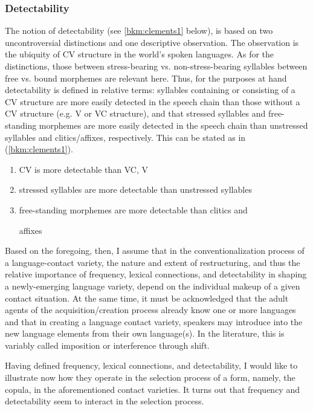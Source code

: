 \documentclass[output=paper,colorlinks,citecolor=brown]{langscibook}
\begin{document}
\subsubsection{Detectability}
The notion of detectability (see \ref{bkm:clements1} below), is based on two uncontroversial distinctions and one descriptive observation. The observation is the ubiquity of CV structure in the world's spoken languages. As for the distinctions, those between stress-bearing vs. non-stress-bearing syllables between free vs. bound morphemes are relevant here. Thus, for the purposes at hand detectability is defined in relative terms: syllables containing or consisting of a CV structure are more easily detected in the speech chain than those without a CV structure (e.g. V or VC structure), and that stressed syllables and free-standing morphemes are more easily detected in the speech chain than unstressed syllables and clitics/affixes, respectively. This can be stated as in (\ref{bkm:clements1}).


\begin{enumerate}[label=\alph*.]
	\item CV is more detectable than VC, V

	\item stressed syllables are more detectable than unstressed syllables

	\item free-standing morphemes are more detectable than clitics and

affixes
\end{enumerate}
\z


Based on the foregoing, then, I assume that in the conventionalization process of a language-contact variety, the nature and extent of restructuring, and thus the relative importance of frequency, lexical connections, and detectability in shaping a newly-emerging language variety, depend on the individual makeup of a given contact situation. At the same time, it must be acknowledged that the adult agents of the acquisition/creation process already know one or more languages and that in creating a language contact variety, speakers may introduce into the new language elements from their own language(s). In the literature, this is variably called imposition or interference through shift.

Having defined frequency, lexical connections, and detectability, I would like to illustrate now how they operate in the selection process of a form, namely, the copula, in the aforementioned contact varieties. It turns out that frequency and detectability seem to interact in the selection process.
\end{document}
